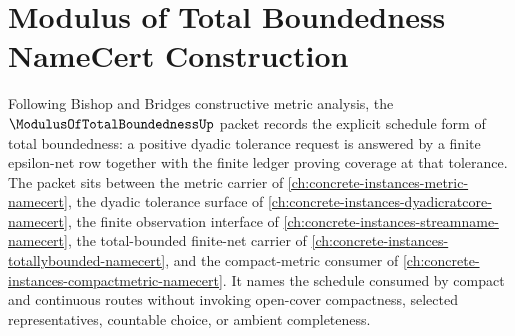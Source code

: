 \chapter{Modulus of Total Boundedness NameCert Construction}
\label{ch:concrete-instances-modulus-of-total-boundedness-namecert}

Following Bishop and Bridges constructive metric analysis, the $\ModulusOfTotalBoundednessUp$ packet records the explicit schedule form of total boundedness: a positive dyadic tolerance request is answered by a finite epsilon-net row together with the finite ledger proving coverage at that tolerance. The packet sits between the metric carrier of \autoref{ch:concrete-instances-metric-namecert}, the dyadic tolerance surface of \autoref{ch:concrete-instances-dyadicratcore-namecert}, the finite observation interface of \autoref{ch:concrete-instances-streamname-namecert}, the total-bounded finite-net carrier of \autoref{ch:concrete-instances-totallybounded-namecert}, and the compact-metric consumer of \autoref{ch:concrete-instances-compactmetric-namecert}. It names the schedule consumed by compact and continuous routes without invoking open-cover compactness, selected representatives, countable choice, or ambient completeness.



